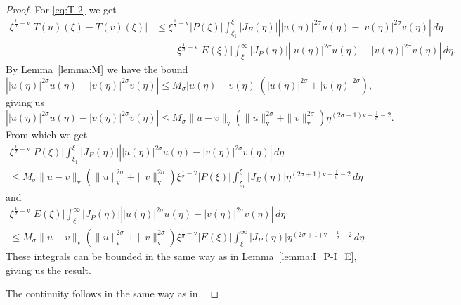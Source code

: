 \documentclass[11pt]{article}
\newcommand{\normv}{\mathrm{v}}
\begin{document}
\begin{proof}
  For \eqref{eq:T-2} we get
  \begin{equation*}
    \begin{split}
      \xi^{\frac{1}{\sigma} - \normv}|T(u)(\xi) - T(v)(\xi)|
      &\leq \xi^{\frac{1}{\sigma} - \normv}|P(\xi)|
        \int_{\xi_{1}}^{\xi}|J_{E}(\eta)|\left||u(\eta)|^{2\sigma}u(\eta) - |v(\eta)|^{2\sigma}v(\eta)\right|\,d\eta\\
      &\quad+ \xi^{\frac{1}{\sigma} - \normv}|E(\xi)|
        \int_{\xi}^{\infty}|J_{P}(\eta)|\left||u(\eta)|^{2\sigma}u(\eta) - |v(\eta)|^{2\sigma}v(\eta)\right|\,d\eta.
    \end{split}
  \end{equation*}
  By Lemma~\ref{lemma:M} we have the bound
  \begin{equation*}
    \left||u(\eta)|^{2\sigma}u(\eta) - |v(\eta)|^{2\sigma}v(\eta)\right|
    \leq M_{\sigma} |u(\eta) - v(\eta)|(|u(\eta)|^{2\sigma} + |v(\eta)|^{2\sigma}),
  \end{equation*}
  giving us
  \begin{equation*}
    \left||u(\eta)|^{2\sigma}u(\eta) - |v(\eta)|^{2\sigma}v(\eta)\right|
    \leq M_{\sigma} \|u - v\|_{\normv}(\|u\|_{\normv}^{2\sigma} + \|v\|_{\normv}^{2\sigma})\eta^{(2\sigma + 1)\normv - \frac{1}{\sigma} - 2}.
  \end{equation*}
  From which we get
  \begin{multline*}
    \xi^{\frac{1}{\sigma} - \normv}|P(\xi)|
    \int_{\xi_{1}}^{\xi}|J_{E}(\eta)|\left||u(\eta)|^{2\sigma}u(\eta) - |v(\eta)|^{2\sigma}v(\eta)\right|\,d\eta\\
    \leq M_{\sigma} \|u - v\|_{\normv}(\|u\|_{\normv}^{2\sigma} + \|v\|_{\normv}^{2\sigma})
    \xi^{\frac{1}{\sigma} - \normv}|P(\xi)|
    \int_{\xi_{1}}^{\xi}|J_{E}(\eta)|\eta^{(2\sigma + 1)\normv - \frac{1}{\sigma} - 2}\,d\eta
  \end{multline*}
  and
  \begin{multline*}
    \xi^{\frac{1}{\sigma} - \normv}|E(\xi)|
    \int_{\xi}^{\infty}|J_{P}(\eta)|\left||u(\eta)|^{2\sigma}u(\eta) - |v(\eta)|^{2\sigma}v(\eta)\right|\,d\eta\\
    \leq M_{\sigma} \|u - v\|_{\normv}(\|u\|_{\normv}^{2\sigma} + \|v\|_{\normv}^{2\sigma})
    \xi^{\frac{1}{\sigma} - \normv}|E(\xi)|
    \int_{\xi}^{\infty}|J_{P}(\eta)|\eta^{(2\sigma + 1)\normv - \frac{1}{\sigma} - 2}\,d\eta
  \end{multline*}
  These integrals can be bounded in the same way as in
  Lemma~\ref{lemma:I_P-I_E}, giving us the result.

  The continuity follows in the same way as in~\cite[Proposition
  A.2]{Plech2001}.
\end{proof}
\end{document}
